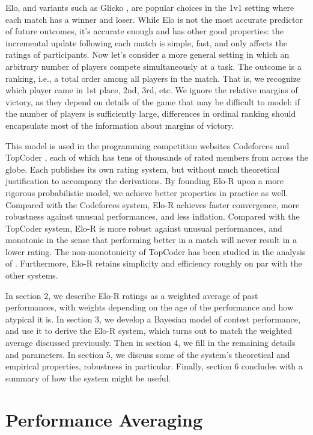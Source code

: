 \documentclass{article}
\begin{document}
Elo, and variants such as Glicko \cite{glicko}, are popular choices in the 1v1 setting where each match has a winner and loser. While Elo is not the most accurate predictor of future outcomes, it's accurate enough and has other good properties: the incremental update following each match is simple, fast, and only affects the ratings of participants. Now let's consider a more general setting in which an arbitrary number of players compete simultaneously at a task. The outcome is a ranking, i.e., a total order among all players in the match. That is, we recognize which player came in 1st place, 2nd, 3rd, etc. We ignore the relative margins of victory, as they depend on details of the game that may be difficult to model: if the number of players is sufficiently large, differences in ordinal ranking should encapsulate most of the information about margins of victory.

This model is used in the programming competition websites Codeforces \cite{Codeforces} and TopCoder \cite{TopCoder}, each of which has tens of thousands of rated members from across the globe. Each publishes its own rating system, but without much theoretical justification to accompany the derivations. By founding Elo-R upon a more rigorous probabilistic model, we achieve better properties in practice as well. Compared with the Codeforces system, Elo-R achieves faster convergence, more robustness against unusual performances, and less inflation. Compared with the TopCoder system, Elo-R is more robust against unusual performances, and monotonic in the sense that performing better in a match will never result in a lower rating. The non-monotonicity of TopCoder has been studied in the analysis of \cite{forivsektheoretical}. Furthermore, Elo-R retains simplicity and efficiency roughly on par with the other systems.

In section 2, we describe Elo-R ratings as a weighted average of past performances, with weights depending on the age of the performance and how atypical it is. In section 3, we develop a Bayesian model of contest performance, and use it to derive the Elo-R system, which turns out to match the weighted average discussed previously. Then in section 4, we fill in the remaining details and parameters. In section 5, we discuss some of the system's theoretical and empirical properties, robustness in particular. Finally, section 6 concludes with a summary of how the system might be useful.

\section{Performance Averaging}
\end{document}
